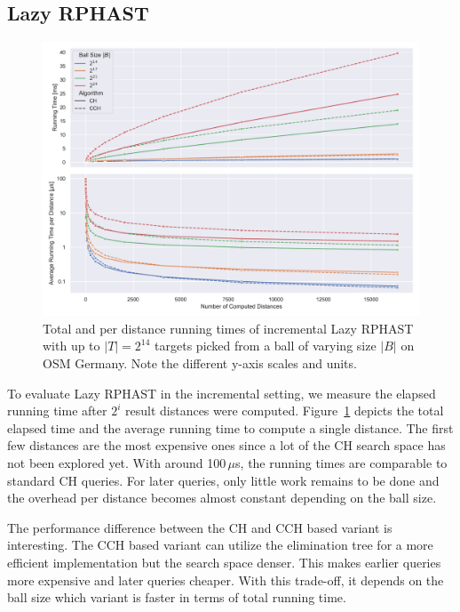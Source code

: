 \documentclass[manuscript,review]{acmart}
\begin{document}
\subsection{Lazy RPHAST}\label{sec:exp_lazy_rphast}


\begin{figure}
\centering
\includegraphics[width=\linewidth]{fig/lazy_rphast_inc.pdf}
\caption{
Total and per distance running times of incremental Lazy RPHAST with up to $|T| = 2^{14}$ targets picked from a ball of varying size $|B|$ on OSM Germany.
Note the different y-axis scales and units.
}\label{fig:lazy_rphast_inc}
\end{figure}

To evaluate Lazy RPHAST in the incremental setting, we measure the elapsed running time after $2^i$ result distances were computed. %
Figure~\ref{fig:lazy_rphast_inc} depicts the total elapsed time and the average running time to compute a single distance.
The first few distances are the most expensive ones since a lot of the CH search space has not been explored yet.
With around 100\,$\mu$s, the running times are comparable to standard CH queries.
For later queries, only little work remains to be done and the overhead per distance becomes almost constant depending on the ball size.

The performance difference between the CH and CCH based variant is interesting.
The CCH based variant can utilize the elimination tree for a more efficient implementation but the search space denser.
This makes earlier queries more expensive and later queries cheaper.
With this trade-off, it depends on the ball size which variant is faster in terms of total running time.
\end{document}
